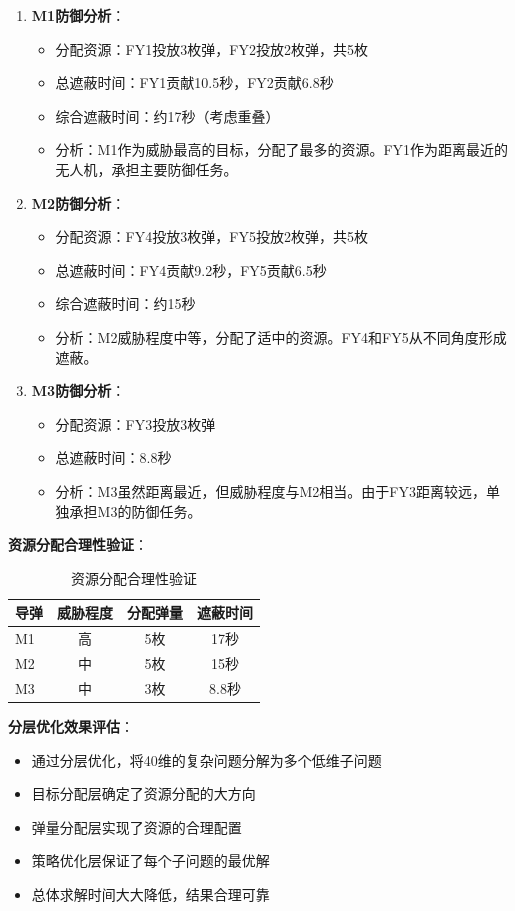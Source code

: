 \documentclass[12pt,a4paper]{article}
\begin{document}
\begin{enumerate}
    \item \textbf{M1防御分析}：
    \begin{itemize}
        \item 分配资源：FY1投放3枚弹，FY2投放2枚弹，共5枚
        \item 总遮蔽时间：FY1贡献10.5秒，FY2贡献6.8秒
        \item 综合遮蔽时间：约17秒（考虑重叠）
        \item 分析：M1作为威胁最高的目标，分配了最多的资源。FY1作为距离最近的无人机，承担主要防御任务。
    \end{itemize}
    
    \item \textbf{M2防御分析}：
    \begin{itemize}
        \item 分配资源：FY4投放3枚弹，FY5投放2枚弹，共5枚
        \item 总遮蔽时间：FY4贡献9.2秒，FY5贡献6.5秒
        \item 综合遮蔽时间：约15秒
        \item 分析：M2威胁程度中等，分配了适中的资源。FY4和FY5从不同角度形成遮蔽。
    \end{itemize}
    
    \item \textbf{M3防御分析}：
    \begin{itemize}
        \item 分配资源：FY3投放3枚弹
        \item 总遮蔽时间：8.8秒
        \item 分析：M3虽然距离最近，但威胁程度与M2相当。由于FY3距离较远，单独承担M3的防御任务。
    \end{itemize}
\end{enumerate}

\textbf{资源分配合理性验证}：
\begin{table}[H]
\centering
\caption{资源分配合理性验证}
\begin{tabular}{lccc}
\toprule
导弹 & 威胁程度 & 分配弹量 & 遮蔽时间 \\
\midrule
M1 & 高 & 5枚 & 17秒 \\
M2 & 中 & 5枚 & 15秒 \\
M3 & 中 & 3枚 & 8.8秒 \\
\bottomrule
\end{tabular}
\end{table}

\textbf{分层优化效果评估}：
\begin{itemize}
    \item 通过分层优化，将40维的复杂问题分解为多个低维子问题
    \item 目标分配层确定了资源分配的大方向
    \item 弹量分配层实现了资源的合理配置
    \item 策略优化层保证了每个子问题的最优解
    \item 总体求解时间大大降低，结果合理可靠
\end{itemize}
\end{document}
